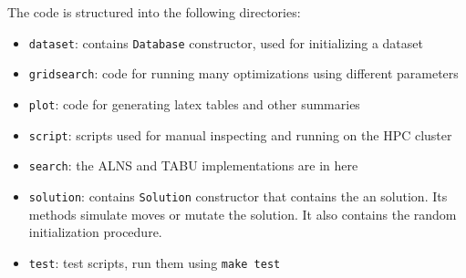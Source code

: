 The code is structured into the following directories:

\begin{itemize}
\item \texttt{dataset}: contains \texttt{Database} constructor, used for initializing a dataset
\item \texttt{gridsearch}: code for running many optimizations using different parameters
\item \texttt{plot}: code for generating latex tables and other summaries
\item \texttt{script}: scripts used for manual inspecting and running on the HPC cluster
\item \texttt{search}: the ALNS and TABU implementations are in here
\item \texttt{solution}: contains \texttt{Solution} constructor that contains the an solution. Its
 methods simulate moves or mutate the solution. It also contains the random
 initialization procedure.
\item \texttt{test}: test scripts, run them using \texttt{make test}
\end{itemize}
